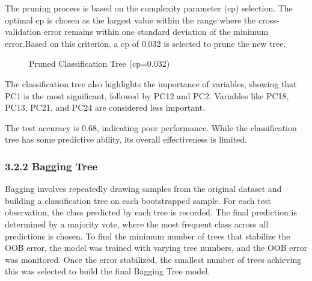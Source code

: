 \documentclass[
  12pt,
  letterpaper,
  DIV=11,
  numbers=noendperiod]{scrartcl}
\begin{document}
The pruning process is based on the complexity parameter (cp) selection.
The optimal cp is chosen as the largest value within the range where the
cross-validation error remains within one standard deviation of the
minimum error.Based on this criterion, a cp of 0.032 is selected to
prune the new tree.

\begin{figure}


\caption{\label{fig-tree2}Pruned Classification Tree (cp=0.032)}

\end{figure}%

The classification tree also highlights the importance of variables,
showing that PC1 is the most significant, followed by PC12 and PC2.
Variables like PC18, PC13, PC21, and PC24 are considered less important.

The test accuracy is 0.68, indicating poor performance. While the
classification tree has some predictive ability, its overall
effectiveness is limited.

\subsubsection{3.2.2 Bagging Tree}\label{bagging-tree}

Bagging involves repeatedly drawing samples from the original dataset
and building a classification tree on each bootstrapped sample. For each
test observation, the class predicted by each tree is recorded. The
final prediction is determined by a majority vote, where the most
frequent class across all predictions is chosen. To find the minimum
number of trees that stabilize the OOB error, the model was trained with
varying tree numbers, and the OOB error was monitored. Once the error
stabilized, the smallest number of trees achieving this was selected to
build the final Bagging Tree model.
\end{document}
